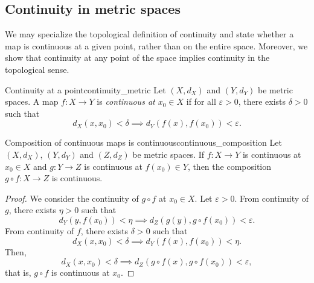\subsection{Continuity in metric spaces}
We may specialize the topological definition of continuity and state whether a map is continuous at a given point, rather than on the entire space. Moreover, we show that continuity at any point of the space implies continuity in the topological sense.
\begin{definition}{Continuity at a point}{continuity_metric}
    Let \((X,d_X)\) and \((Y, d_Y)\) be metric spaces. A map \(f : X \to Y\) is \emph{continuous at \(x_0 \in X\)} if for all \(\varepsilon > 0\), there exists \(\delta > 0\) such that
    \begin{equation*}
        d_X(x, x_0) < \delta \implies d_Y(f(x), f(x_0)) < \varepsilon.
    \end{equation*}
\end{definition}

\begin{proposition}{Composition of continuous maps is continuous}{continuous_composition}
    Let \((X, d_X)\), \((Y, d_Y)\) and \((Z, d_Z)\) be metric spaces. If \(f : X \to Y\) is continuous at \(x_0 \in X\) and \(g : Y \to Z\) is continuous at \(f(x_0) \in Y\), then the composition \(g\circ f : X \to Z\) is continuous.
\end{proposition}
\begin{proof}
    We consider the continuity of \(g\circ f\) at \(x_0 \in X\). Let \(\varepsilon > 0\). From continuity of \(g\), there exists \(\eta > 0\) such that
    \begin{equation*}
        d_Y(y, f(x_0)) < \eta \implies d_Z(g(y), g\circ f(x_0)) < \varepsilon.
    \end{equation*}
    From continuity of \(f\), there exists \(\delta > 0\) such that
    \begin{equation*}
        d_X(x, x_0) < \delta \implies d_Y(f(x), f(x_0)) < \eta.
    \end{equation*}
    Then,
    \begin{equation*}
        d_X(x, x_0) < \delta \implies d_Z(g\circ f(x), g\circ f(x_0)) < \varepsilon,
    \end{equation*}
    that is, \(g\circ f\) is continuous at \(x_0\).
\end{proof}

